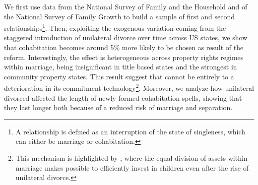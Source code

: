 \documentclass[12pt]{article}
\numberwithin{table}{section}
\begin{document}
We first use data from the National Survey of Family and the Household and of the National Survey of Family Growth to build a sample of first and second relationships\footnote{A relationship is defined as an interruption of the state of singleness, which can either be marriage or cohabitation.}. Then, exploiting the exogenous variation coming from the staggered introduction of unilateral divorce over time across US states, we show that cohabitation becomes around 5\% more likely  to be chosen as result of the reform. Interestingly,  the effect is heterogeneous across property rights regimes within marriage, being insignificant in title based states and the strongest in community property states. This result suggest that cannot be entirely to a deterioration in its commitment technology\footnote{This mechanism is highlighted by \cite{lafortune2019}, where the equal division of assets within marriage makes possible to efficiently invest in children even after the rise of unilateral divorce.}. Moreover, we analyze how unilateral divorced affected the length of newly formed cohabitation spells, showing that they last longer both because of a reduced risk of marriage and separation.
\end{document}
